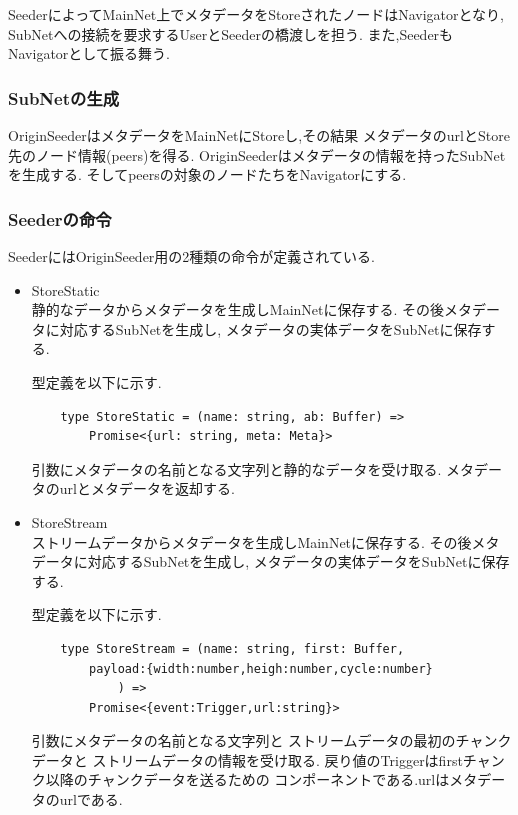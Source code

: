 \documentclass[sotsuron]{jcsie}
\begin{document}
SeederによってMainNet上でメタデータをStoreされたノードはNavigatorとなり,
SubNetへの接続を要求するUserとSeederの橋渡しを担う.
また,SeederもNavigatorとして振る舞う.


\subsubsection{SubNetの生成}
OriginSeederはメタデータをMainNetにStoreし,その結果
メタデータのurlとStore先のノード情報(peers)を得る.
OriginSeederはメタデータの情報を持ったSubNetを生成する.
そしてpeersの対象のノードたちをNavigatorにする.

\subsubsection{Seederの命令}
SeederにはOriginSeeder用の2種類の命令が定義されている.
\begin{itemize}
	\item{StoreStatic} \\
	静的なデータからメタデータを生成しMainNetに保存する.
	その後メタデータに対応するSubNetを生成し,
	メタデータの実体データをSubNetに保存する.
			
	型定義を以下に示す.
	\begin{lstlisting}
	type StoreStatic = (name: string, ab: Buffer) =>
		Promise<{url: string, meta: Meta}>
	\end{lstlisting}
			
	引数にメタデータの名前となる文字列と静的なデータを受け取る.
	メタデータのurlとメタデータを返却する.
		
	\item {StoreStream}\\
	      ストリームデータからメタデータを生成しMainNetに保存する.
	      その後メタデータに対応するSubNetを生成し,
	      メタデータの実体データをSubNetに保存する.
	      	      
	      型定義を以下に示す.
	      \begin{lstlisting}
	type StoreStream = (name: string, first: Buffer,
		payload:{width:number,heigh:number,cycle:number}
			) =>
		Promise<{event:Trigger,url:string}>
	      \end{lstlisting}
	      	      
	      引数にメタデータの名前となる文字列と
	      ストリームデータの最初のチャンクデータと
	      ストリームデータの情報を受け取る.
	      戻り値のTriggerはfirstチャンク以降のチャンクデータを送るための
	      コンポーネントである.urlはメタデータのurlである.
\end{itemize}
\end{document}
